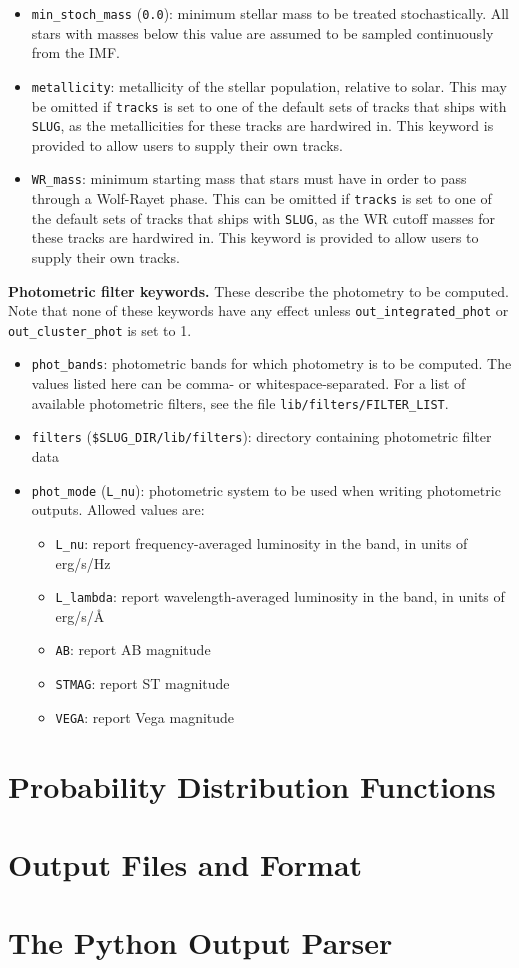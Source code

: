 \documentclass[12pt]{article}
\newcommand{\slug}{\texttt{SLUG}}
\begin{document}
\begin{itemize}
\item \verb=min_stoch_mass= (\verb=0.0=): minimum stellar mass to be treated stochastically. All stars with masses below this value are assumed to be sampled continuously from the IMF.
\item \verb=metallicity=: metallicity of the stellar population, relative to solar. This may be omitted if \verb=tracks= is set to one of the default sets of tracks that ships with \slug, as the metallicities for these tracks are hardwired in. This keyword is provided to allow users to supply their own tracks.
\item \verb=WR_mass=: minimum starting mass that stars must have in order to pass through a Wolf-Rayet phase. This can be omitted if \verb=tracks= is set to one of the default sets of tracks that ships with \slug, as the WR cutoff masses for these tracks are hardwired in. This keyword is provided to allow users to supply their own tracks.
\end{itemize}

\noindent
\textbf{Photometric filter keywords.} These describe the photometry to be computed. Note that none of these keywords have any effect unless \verb=out_integrated_phot= or \verb=out_cluster_phot= is set to 1.
\begin{itemize}
\item \verb=phot_bands=: photometric bands for which photometry is to be computed. The values listed here can be comma- or whitespace-separated. For a list of available photometric filters, see the file \verb=lib/filters/FILTER_LIST=.
\item \verb=filters= (\verb=$SLUG_DIR/lib/filters=): directory containing photometric filter data
\item \verb=phot_mode= (\verb=L_nu=): photometric system to be used when writing photometric outputs. Allowed values are:
\begin{itemize}
\item \verb=L_nu=: report frequency-averaged luminosity in the band, in units of erg/s/Hz
\item \verb=L_lambda=: report wavelength-averaged luminosity in the band, in units of erg/s/\AA
\item \verb=AB=: report AB magnitude
\item \verb=STMAG=: report ST magnitude
\item \verb=VEGA=: report Vega magnitude
\end{itemize}
\end{itemize}

\section{Probability Distribution Functions}
\label{sec:pdfs}


\section{Output Files and Format}
\label{sec:output}

\section{The Python Output Parser}
\end{document}
